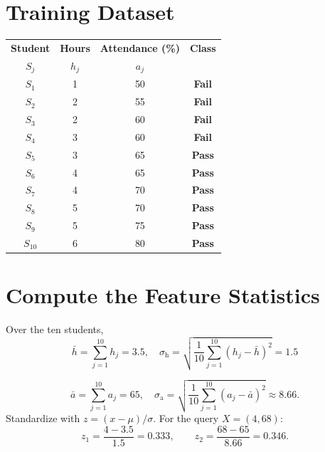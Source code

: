 \documentclass[11pt,a4paper]{report}
\newcommand{\classpass}{\textbf{\textcolor{cteal}{Pass}}}
\newcommand{\classfail}{\textbf{\textcolor{ccoral}{Fail}}}
\theoremstyle{definition}
\theoremstyle{remark}
\begin{document}
	\section{Training Dataset}
	\begin{center}
		\renewcommand{\arraystretch}{1.2}
		\begin{tabular}{c c c c}
			\toprule
			\textbf{Student} & \textbf{Hours} & \textbf{Attendance (\%)} & \textbf{Class}\\
			$S_{j}$ & $h_{j}$ & $a_{j}$ & \\
			\midrule
			$S_{1}$  & 1 & 50 & \classfail\\
			$S_{2}$  & 2 & 55 & \classfail\\
			$S_{3}$  & 2 & 60 & \classfail\\
			$S_{4}$  & 3 & 60 & \classfail\\
			$S_{5}$  & 3 & 65 & \classpass\\
			$S_{6}$  & 4 & 65 & \classpass\\
			$S_{7}$  & 4 & 70 & \classpass\\
			$S_{8}$  & 5 & 70 & \classpass\\
			$S_{9}$  & 5 & 75 & \classpass\\
			$S_{10}$ & 6 & 80 & \classpass\\
			\bottomrule
		\end{tabular}
	\end{center}
	
	\section{Compute the Feature Statistics}
	Over the ten students,
	\[
	\bar{h}=\sum\limits_{j=1}^{10} h_{j}=3.5,\quad \sigma_{\text{h}}=\sqrt{\dfrac{1}{10}\sum\limits_{j=1}^{10}\left( h_j-\bar{h} \right)^2}=1.5
	\]
	
	\[
	\bar{a}=\sum\limits_{j=1}^{10} a_{j}=65,\quad \sigma_{\text{a}}=\sqrt{\dfrac{1}{10}\sum\limits_{j=1}^{10}\left( a_j-\bar{a} \right)^2}\approx8.66 .
	\]
	Standardize with $z=(x-\mu)/\sigma$. For the query $X=(4,68)$:
	\[
	z_1=\frac{4-3.5}{1.5}=0.333,\qquad z_2=\frac{68-65}{8.66}=0.346 .
	\]
	
\end{document}
